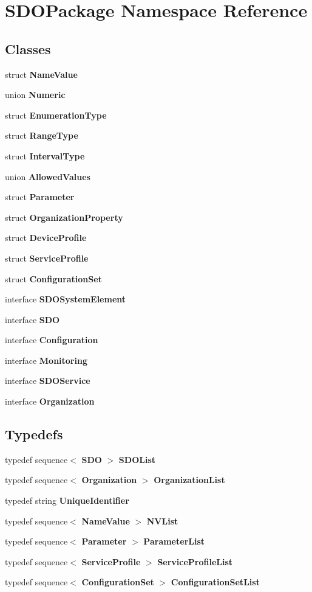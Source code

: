 \section{SDOPackage Namespace Reference}
\label{namespaceSDOPackage}


\subsection*{Classes}
\begin{CompactItemize}
\item 
struct {\bf Name\-Value}
\item 
union {\bf Numeric}
\item 
struct {\bf Enumeration\-Type}
\item 
struct {\bf Range\-Type}
\item 
struct {\bf Interval\-Type}
\item 
union {\bf Allowed\-Values}
\item 
struct {\bf Parameter}
\item 
struct {\bf Organization\-Property}
\item 
struct {\bf Device\-Profile}
\item 
struct {\bf Service\-Profile}
\item 
struct {\bf Configuration\-Set}
\item 
interface {\bf SDOSystem\-Element}
\item 
interface {\bf SDO}
\item 
interface {\bf Configuration}
\item 
interface {\bf Monitoring}
\item 
interface {\bf SDOService}
\item 
interface {\bf Organization}
\end{CompactItemize}
\subsection*{Typedefs}
\begin{CompactItemize}
\item 
typedef sequence$<$ {\bf SDO} $>$ {\bf SDOList}
\item 
typedef sequence$<$ {\bf Organization} $>$ {\bf Organization\-List}
\item 
typedef string {\bf Unique\-Identifier}
\item 
typedef sequence$<$ {\bf Name\-Value} $>$ {\bf NVList}
\item 
typedef sequence$<$ {\bf Parameter} $>$ {\bf Parameter\-List}
\item 
typedef sequence$<$ {\bf Service\-Profile} $>$ {\bf Service\-Profile\-List}
\item 
typedef sequence$<$ {\bf Configuration\-Set} $>$ {\bf Configuration\-Set\-List}
\end{CompactItemize}
